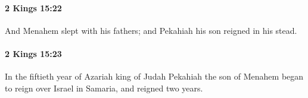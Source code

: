 		\paragraph{2 Kings 15:22} %
			\label{2KINGS-15-22}

			And Menahem slept with his fathers; and Pekahiah his son reigned in his stead.


		\paragraph{2 Kings 15:23} %
			\label{2KINGS-15-23}

			In the fiftieth year of Azariah king of Judah Pekahiah the son of Menahem began to reign over Israel in Samaria, and reigned two years.


